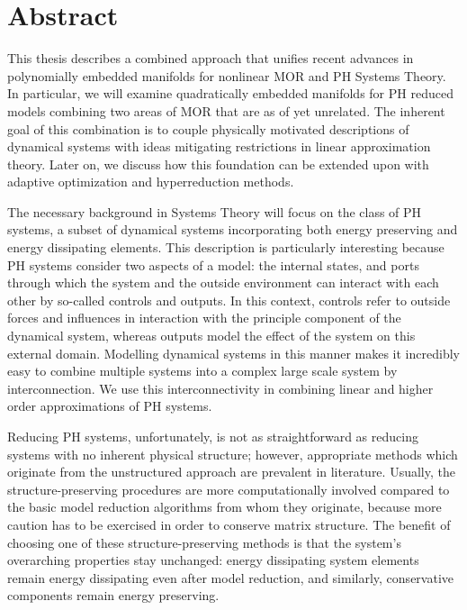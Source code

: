 \chapter*{Abstract}

This thesis describes a combined approach that unifies recent advances in polynomially embedded manifolds for nonlinear \acl{MOR} and \acl{PH} Systems Theory.
In particular, we will examine quadratically embedded manifolds for \acl{PH} reduced models combining two areas of \acl{MOR} that are as of yet unrelated.
The inherent goal of this combination is to couple physically motivated descriptions of dynamical systems with ideas mitigating restrictions in linear approximation theory.
Later on, we discuss how this foundation can be extended upon with adaptive optimization and hyperreduction methods.

The necessary background in Systems Theory will focus on the class of \acl{PH} systems, a subset of dynamical systems incorporating both energy preserving and energy dissipating elements.
This description is particularly interesting because \acl{PH} systems consider two aspects of a model: the internal states, and ports through which the system and the outside environment can interact with each other by so-called controls and outputs.
In this context, controls refer to outside forces and influences in interaction with the principle component of the dynamical system, whereas outputs model the effect of the system on this external domain.
Modelling dynamical systems in this manner makes it incredibly easy to combine multiple systems into a complex large scale system by interconnection.
We use this interconnectivity in combining linear and higher order approximations of \acl{PH} systems.

Reducing \acl{PH} systems, unfortunately, is not as straightforward as reducing systems with no inherent physical structure; however, appropriate methods which originate from the unstructured approach are prevalent in literature.
Usually, the structure-preserving procedures are more computationally involved compared to the basic model reduction algorithms from whom they originate, because more caution has to be exercised in order to conserve matrix structure.
The benefit of choosing one of these structure-preserving methods is that the system's overarching properties stay unchanged: energy dissipating system elements remain energy dissipating even after model reduction, and similarly, conservative components remain energy preserving.

